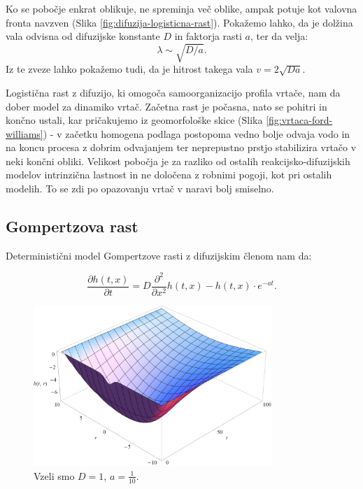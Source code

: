 \documentclass[a4paper, twoside, 12pt]{book}
\begin{document}
Ko se pobočje enkrat oblikuje, ne spreminja več oblike, ampak potuje kot valovna fronta navzven (Slika \ref{fig:difuzija-logisticna-rast}). Pokažemo lahko, da je dolžina vala odvisna od difuzijske konstante $D$ in faktorja rasti $a$, ter da velja: 
    \[ \lambda \sim \sqrt{D/a}. \]
Iz te zveze lahko pokažemo tudi, da je hitrost takega vala $v = 2 \sqrt{D a}$.

Logistična rast z difuzijo, ki omogoča samoorganizacijo profila vrtače, nam da dober model za dinamiko vrtač. Začetna rast je počasna, nato se pohitri in končno ustali, kar pričakujemo iz geomorfološke skice (Slika \ref{fig:vrtaca-ford-williams}) - v začetku homogena podlaga postopoma vedno bolje odvaja vodo in na koncu procesa z dobrim odvajanjem ter neprepustno prstjo stabilizira vrtačo v neki končni obliki.
Velikost pobočja je za razliko od ostalih reakcijsko-difuzijskih modelov intrinzična lastnost in ne določena z robnimi pogoji, kot pri ostalih modelih. To se zdi po opazovanju vrtač v naravi bolj smiselno.

    \subsection{Gompertzova rast}

    Deterministični model Gompertzove rasti z difuzijskim členom nam da:

    \begin{equation}
      \frac{ \partial h(t,x) }{ \partial t} = D \frac{\partial^2}{ \partial x^2} h(t,x) - h(t,x) \cdot e^{-a t}.
      \label{difuzija-gompertzova-rast}
    \end{equation}
    \begin{figure}[h]
      \begin{center}
        \includegraphics[width=9cm]{slike/difuzija-gompertzova-rast2}
      \end{center}
      \caption{Vzeli smo $D=1$, $a=\frac{1}{10}$.}
      \label{fig:difuzija-gompertzova-rast}
    \end{figure}
\end{document}
